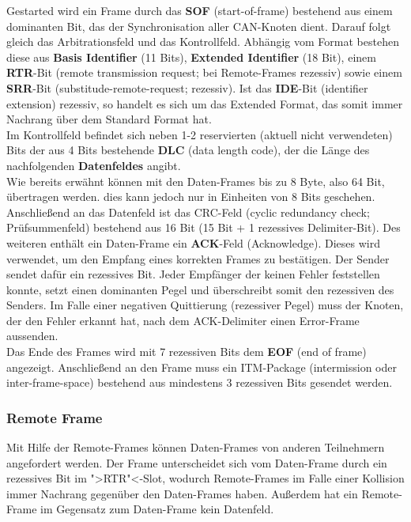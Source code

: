 Gestarted wird ein Frame durch das \textbf{SOF} (start-of-frame)
bestehend aus einem dominanten Bit, das der Synchronisation aller CAN-Knoten dient. Darauf folgt gleich das
Arbitrationsfeld und das Kontrollfeld. Abhängig vom Format bestehen
diese aus \textbf{Basis Identifier} (11 Bits), \textbf{Extended
Identifier} (18 Bit), einem \textbf{RTR}-Bit (remote transmission
request; bei Remote-Frames rezessiv) sowie einem \textbf{SRR}-Bit
(substitude-remote-request; rezessiv). Ist das \textbf{IDE}-Bit
(identifier extension) rezessiv, so handelt es sich um das Extended
Format, das somit immer Nachrang über dem Standard Format hat.\\ Im
Kontrollfeld befindet sich neben 1-2 reservierten (aktuell nicht
verwendeten) Bits der aus 4 Bits bestehende \textbf{DLC} (data length
code), der die Länge des nachfolgenden \textbf{Datenfeldes} angibt.\\
Wie bereits erwähnt können mit den Daten-Frames bis zu 8 Byte, also 64
Bit, übertragen werden. dies kann jedoch nur in Einheiten von 8 Bits
geschehen. Anschließend an das Datenfeld ist das CRC-Feld (cyclic
redundancy check; Prüfsummenfeld) bestehend aus 16 Bit (15 Bit + 1
rezessives Delimiter-Bit). Des weiteren enthält ein Daten-Frame ein
\textbf{ACK}-Feld (Acknowledge). Dieses wird verwendet, um den Empfang
eines korrekten Frames zu bestätigen. Der Sender sendet dafür ein
rezessives Bit. Jeder Empfänger der keinen Fehler feststellen konnte,
setzt einen dominanten Pegel und überschreibt somit den rezessiven des
Senders. Im Falle einer negativen Quittierung (rezessiver Pegel) muss
der Knoten, der den Fehler erkannt hat, nach dem ACK-Delimiter einen
Error-Frame aussenden.\\Das Ende des Frames wird mit 7 rezessiven Bits
dem \textbf{EOF} (end of frame) angezeigt. Anschließend an den Frame
muss ein ITM-Package (intermission oder inter-frame-space) bestehend
aus mindestens 3 rezessiven Bits gesendet werden.
	
\subsubsection{Remote Frame} Mit Hilfe der Remote-Frames können
Daten-Frames von anderen Teilnehmern angefordert werden. Der Frame
unterscheidet sich vom Daten-Frame durch ein rezessives Bit im
">RTR"<-Slot, wodurch Remote-Frames im Falle einer Kollision immer
Nachrang gegenüber den Daten-Frames haben. Außerdem hat ein Remote-Frame im Gegensatz zum Daten-Frame kein Datenfeld.
	
